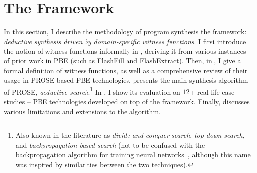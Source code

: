 \chapter{The \PROSE Framework}
\label{ch:prose}

In this section, I describe the methodology of program synthesis the \PROSE framework: \emph{deductive synthesis
driven by domain-specific witness functions}.
I first introduce the notion of witness functions informally in , deriving it from various
instances of prior work in PBE (such as FlashFill and FlashExtract).
Then, in , I give a formal definition of witness functions, as well as a comprehensive review of
their usage in PROSE-based PBE technologies.
 presents the main synthesis algorithm of PROSE, \emph{deductive search}.\footnote{Also known
    in the literature as \emph{divide-and-conquer search}, \emph{top-down search}, and \emph{backpropagation-based
    search} (not to be confused with the backpropagation algorithm for training neural
    networks~\cite{chauvin1995backpropagation}, although this name was inspired by similarities between the two
techniques).}
In , I show its evaluation on $12$+ real-life case studies -- PBE technologies developed on top
of the framework.
Finally,  discusses various limitations and extensions to the algorithm.






